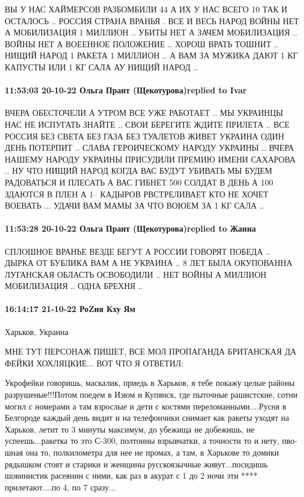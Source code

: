 ВЫ У НАС ХАЙМЕРСОВ РАЗБОМБИЛИ 44 А ИХ У НАС ВСЕГО 10 ТАК И ОСТАЛОСЬ .. РОССИЯ
СТРАНА ВРАНЬЯ . ВСЕ И ВЕСЬ НАРОД ВОЙНЫ НЕТ А МОБИЛИЗАЦИЯ 1 МИЛЛИОН .. УБИТЫ НЕТ
А ЗАЧЕМ МОБИЛИЗАЦИЯ .. ВОЙНЫ НЕТ А ВОЕЕННОЕ ПОЛОЖЕНИЕ .. ХОРОШ ВРАТЬ ТОШНИТ ..
НИЩИЙ НАРОД 1 РАКЕТА 1 МИЛЛИОН .. А ВАМ ЗА МУЖИКА ДАЮТ 1 КГ КАПУСТЫ ИЛИ 1 КГ
САЛА АУ НИЩИЙ НАРОД ..

\paragraph{11:53:03 20-10-22 Ольга Прант (Щекотурова)replied to Ivar}

ВЧЕРА ОБЕСТОЧЕЛИ А УТРОМ ВСЕ УЖЕ РАБОТАЕТ .. МЫ УКРАИНЦЫ НАС НЕ ИСПУГАТЬ ЗНАЙТЕ
.. СВОИ БЕРЕГИТЕ ЖДИТЕ ПРИЛЕТА .. ВСЕ РОССИЯ БЕЗ СВЕТА БЕЗ ГАЗА БЕЗ ТУАЛЕТОВ
ЖИВЕТ УКРАИНА ОДИН ДЕНЬ ПОТЕРПИТ .. СЛАВА ГЕРОИЧЕСКОМУ НАРОДУ УКРАИНЫ .. ВЧЕРА
НАШЕМУ НАРОДУ УКРАИНЫ ПРИСУДИЛИ ПРЕМИЮ ИМЕНИ САХАРОВА .. НУ ЧТО НИЩИЙ НАРОД
КОГДА ВАС БУДУТ УБИВАТЬ МЫ БУДЕМ РАДОВАТЬСЯ И ПЛЕСАТЬ А ВАС ГИБНЕТ 500 СОЛДАТ В
ДЕНЬ А 100 ЗДАЮТСЯ В ПЛЕН А 1-- КАДЫРОВ РВСТРЕЛИВАЕТ КТО НЕ ХОЧЕТ ВОЕВАТЬ ...
УДАЧИ ВАМ МАМЫ ЗА ЧТО ВОЮЕМ ЗА 1 КГ САЛА ..

\paragraph{11:53:28 20-10-22 Ольга Прант (Щекотурова)replied to Жанна}

СПЛОШНОЕ ВРАНЬЕ ВЕЗДЕ БЕГУТ А РОССИИ ГОВОРЯТ ПОБЕДА .. ДЫРКА ОТ БУБЛИКА ВАМ А
НЕ УКРАИНА .. 8 ЛЕТ БЫЛА ОКУПОВАННА ЛУГАНСКАЯ ОБЛАСТЬ ОСВОБОДИЛИ .. НЕТ ВОЙНЫ А
МИЛЛИОН МОБИЛИЗАЦИЯ .. ОДНА БРЕХНЯ ..


\paragraph{16:14:17 21-10-22 РоZия Кху Ям}

Харьков, Украина

МНЕ ТУТ ПЕРСОНАЖ ПИШЕТ, ВСЕ МОЛ ПРОПАГАНДА БРИТАНСКАЯ ДА ФЕЙКИ ХОХЛЯЦКИЕ...
ВОТ ЧТО Я ОТВЕТИЛ:

Укрофейки говоришь, маскалик, приедь в Харьков, я тебе покажу целые районы
разрушеные!!!Потом поедем в Изюм и Купянск, где пыточные рашистские, сотни
могил с номерами а там взрослые и дети с костями переломанными....Русня в
Белгороде каждый день видит и на телефончики снимает как ракеты уходят на
Харьков, летит то 3 минуты максимум, до убежища не добежишь, не
успеешь...ракетка то это С-300, полтонны взрывчатки, а точности то и нету,
пво-шная она то, полкилометра для нее не промах, а там, в Харькове то домики
рядышком стоят и старики и женщины русскоязычные живут...посидишь шовинистик
расеянин с ними, как раз в акурат с 1 до 2 ночи эти **** прилетают....по 4, по
7 сразу...


